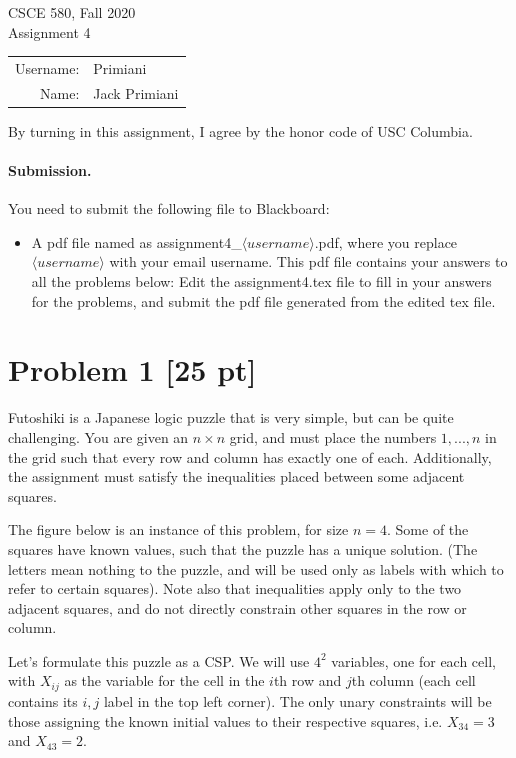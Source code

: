 \documentclass[12pt]{article}
\theoremstyle{case}
\begin{document}
\begin{center}
{\Large CSCE 580, Fall 2020 \\ Assignment 4}

\begin{tabular}{rl}
Username: & Primiani \\
Name: & Jack Primiani \\
\end{tabular}
\end{center}

By turning in this assignment, I agree by the honor code of USC Columbia.

\paragraph{Submission.}
You need to submit the following file to Blackboard:
\begin{itemize}
    \item A pdf file named as assignment4\_$\langle username \rangle$.pdf, where you replace $\langle username \rangle$ with your email username. This pdf file contains your answers to all the problems below: Edit the assignment4.tex file to fill in your answers for the problems, and submit the pdf file generated from the edited tex file. 
\end{itemize}

\section*{Problem 1 [25 pt]}
Futoshiki is a Japanese logic puzzle that is very simple, but can be quite challenging. You are given an $n \times n$ grid, and must place the numbers $1,...,n$ in the grid such that every row and column has exactly one of each. Additionally, the assignment must satisfy the inequalities placed between some adjacent squares.

The figure below is an instance of this problem, for size $n = 4$. Some of the squares have known values, such that the puzzle has a unique solution. (The letters mean nothing to the puzzle, and will be used only as labels with which to refer to certain squares). Note also that inequalities apply only to the two adjacent squares, and do not directly constrain other squares in the row or column.

Let’s formulate this puzzle as a CSP. We will use $4^2$ variables, one for each cell, with $X_{ij}$ as the variable for the cell in the $i$th row and $j$th column (each cell contains its $i,j$ label in the top left corner). The only unary constraints will be those assigning the known initial values to their respective squares, i.e. $X_{34} = 3$ and $X_{43}=2$.
\end{document}
